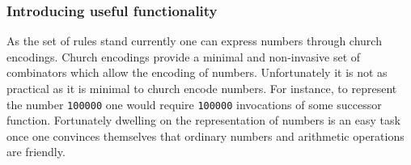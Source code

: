 

\subsubsection{Introducing useful functionality}
As the set of rules stand currently one can express numbers through church encodings.
Church encodings provide a minimal and non-invasive set of combinators which allow the encoding of numbers.
Unfortunately it is not as practical as it is minimal to church encode numbers.
For instance, to represent the number \texttt{100000} one would require \texttt{100000} invocations of some successor function.
Fortunately dwelling on the representation of numbers is an easy task once one convinces themselves that ordinary numbers and arithmetic operations are friendly.

